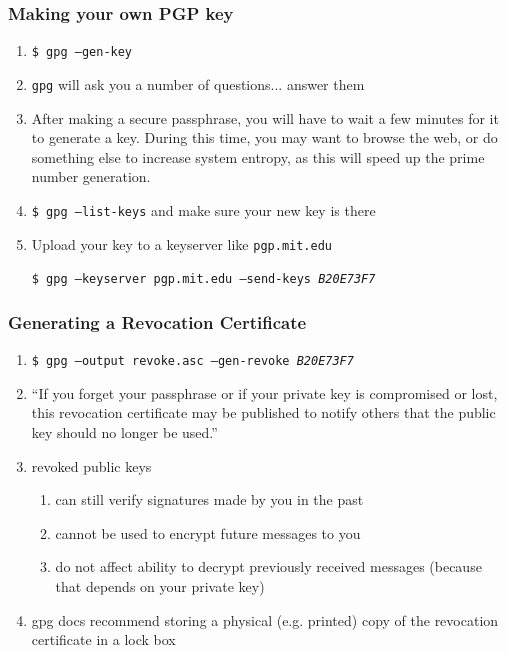 \documentclass{beamer}
\begin{document}
\begin{frame}
    \frametitle{Making your own PGP key}
    \begin{enumerate}[<+->]
        \item \texttt{\$ gpg --gen-key}
        \item \texttt{gpg} will ask you a number of questions... answer them
        \item After making a secure passphrase, you will have to wait a few
            minutes for it to generate a key. During this time, you may want to
            browse the web, or do something else to increase system entropy, as
            this will speed up the prime number generation.
        \item \texttt{\$ gpg --list-keys} and make sure your new key is there
        \item Upload your key to a keyserver like \texttt{pgp.mit.edu}\par
            \texttt{\small \$ gpg --keyserver pgp.mit.edu --send-keys \emph{B20E73F7}}
    \end{enumerate}
\end{frame}

\begin{frame}
	\frametitle{Generating a Revocation Certificate}
	\begin{enumerate}[<+->]
		\item \texttt{\$ gpg --output revoke.asc --gen-revoke \emph{B20E73F7}}
		\item ``If you forget your passphrase or if your private key is compromised or lost, this revocation certificate may be published to
			notify others that the public key should no longer be used.''
		\item revoked public keys
			\begin{enumerate}
				\item can still verify signatures made by you in the past
				\item cannot be used to encrypt future messages to you
				\item do not affect ability to decrypt previously received messages (because that depends on your private key)
			\end{enumerate}
		\item gpg docs recommend storing a physical (e.g. printed) copy of the revocation certificate in a lock box
	\end{enumerate}
\end{frame}
\end{document}
